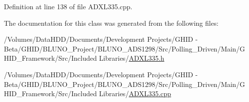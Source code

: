 \-Definition at line 138 of file \-A\-D\-X\-L335.\-cpp.



\-The documentation for this class was generated from the following files\-:\begin{DoxyCompactItemize}
\item 
/\-Volumes/\-Data\-H\-D\-D/\-Documents/\-Development Projects/\-G\-H\-I\-D -\/ Beta/\-G\-H\-I\-D/\-B\-L\-U\-N\-O\-\_\-\-Project/\-B\-L\-U\-N\-O\-\_\-\-A\-D\-S1298/\-Src/\-Polling\-\_\-\-Driven/\-Main/\-G\-H\-I\-D\-\_\-\-Framework/\-Src/\-Included Libraries/\hyperlink{_a_d_x_l335_8h}{\-A\-D\-X\-L335.\-h}\item 
/\-Volumes/\-Data\-H\-D\-D/\-Documents/\-Development Projects/\-G\-H\-I\-D -\/ Beta/\-G\-H\-I\-D/\-B\-L\-U\-N\-O\-\_\-\-Project/\-B\-L\-U\-N\-O\-\_\-\-A\-D\-S1298/\-Src/\-Polling\-\_\-\-Driven/\-Main/\-G\-H\-I\-D\-\_\-\-Framework/\-Src/\-Included Libraries/\hyperlink{_a_d_x_l335_8cpp}{\-A\-D\-X\-L335.\-cpp}\end{DoxyCompactItemize}
